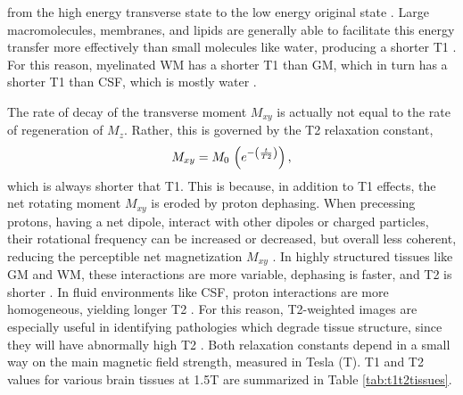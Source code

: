 from the high energy transverse state to the low energy original state \cite{Bloch1946,Bryant2005}.
Large macromolecules, membranes, and lipids are generally able to facilitate this energy transfer
more effectively than small molecules like water, producing a shorter T1 \cite{Koenig1990}.
For this reason, myelinated WM has a shorter T1 than GM,
which in turn has a shorter T1 than CSF, which is mostly water \cite{Roberts2007}.
\par
The rate of decay of the transverse moment $M_{xy}$
is actually not equal to the rate of regeneration of $M_z$.
Rather, this is governed by the T2 relaxation constant,
\begin{equation}
M_{xy} = M_0\thinspace\left(e^{-\left(\frac{t}{T2}\right)}\right)\label{eq:T2},
\end{equation}
which is always shorter that T1.
This is because, in addition to T1 effects,
the net rotating moment $M_{xy}$ is eroded by proton dephasing.
When precessing protons, having a net dipole, interact with other dipoles or charged particles,
their rotational frequency can be increased or decreased, but overall less coherent,
reducing the perceptible net magnetization $M_{xy}$ \cite{Bloch1946}.
In highly structured tissues like GM and WM, these interactions are more variable, 
dephasing is faster, and T2 is shorter \cite{Roberts2007}.
In fluid environments like CSF, proton interactions are more homogeneous,
yielding longer T2 \cite{Roberts2007}.
For this reason, T2-weighted images are especially useful in identifying pathologies
which degrade tissue structure, since they will have abnormally high T2 \cite{Roberts2007}.
Both relaxation constants depend in a small way on the main magnetic field strength,
measured in Tesla (T).
T1 and T2 values for various brain tissues at 1.5T are summarized in Table \ref{tab:t1t2tissues}.
\par
\begin{table}
  \caption{T1 and T2 constants for brain tissues at 1.5 Tesla.}
  \label{tab:t1t2tissues}
\end{table}
